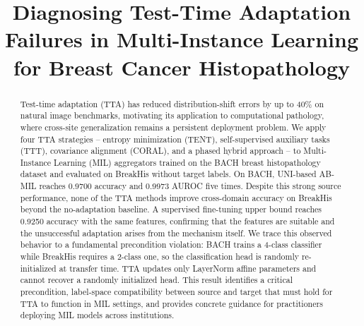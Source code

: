 \documentclass[conference]{IEEEtran}
\begin{document}
\title{Diagnosing Test-Time Adaptation Failures in Multi-Instance Learning for Breast Cancer Histopathology}

\makeatletter
\newcommand{\linebreakand}{%
  \end{@IEEEauthorhalign}
  \hfill\mbox{}\par
  \mbox{}\hfill\begin{@IEEEauthorhalign}
}
\makeatother

 
\maketitle

\begin{abstract}
Test-time adaptation (TTA) has reduced distribution-shift errors by up to 40\% on natural image benchmarks, motivating its application to computational pathology, where cross-site generalization remains a persistent deployment problem. We apply four TTA strategies -- entropy minimization (TENT), self-supervised auxiliary tasks (TTT), covariance alignment (CORAL), and a phased hybrid approach -- to Multi-Instance Learning (MIL) aggregators trained on the BACH breast histopathology dataset and evaluated on BreakHis without target labels. On BACH, UNI-based AB-MIL reaches 0.9700 accuracy and 0.9973 AUROC five times. Despite this strong source performance, none of the TTA methods improve cross-domain accuracy on BreakHis beyond the no-adaptation baseline. A supervised fine-tuning upper bound reaches 0.9250 accuracy with the same features, confirming that the features are suitable and the unsuccessful adaptation arises from the mechanism itself. We trace this observed behavior to a fundamental precondition violation: BACH trains a 4-class classifier while BreakHis requires a 2-class one, so the classification head is randomly re-initialized at transfer time. TTA updates only LayerNorm affine parameters and cannot recover a randomly initialized head. This result identifies a critical precondition, label-space compatibility between source and target that must hold for TTA to function in MIL settings, and provides concrete guidance for practitioners deploying MIL models across institutions.
\end{abstract}
\end{document}
